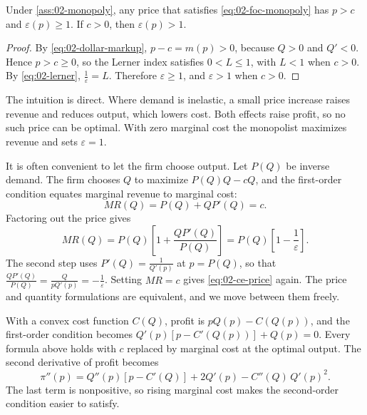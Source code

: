 \begin{proposition}\label{prop:02-elastic}
Under \cref{ass:02-monopoly}, any price that satisfies \eqref{eq:02-foc-monopoly} has $p > c$ and
$\varepsilon(p) \ge 1$. If $c > 0$, then $\varepsilon(p) > 1$.
\end{proposition}

\begin{proof}
By \eqref{eq:02-dollar-markup}, $p - c = m(p) > 0$, because $Q > 0$ and $Q' < 0$. Hence $p > c \ge 0$, so the
Lerner index satisfies $0 < L \le 1$, with $L < 1$ when $c > 0$. By \eqref{eq:02-lerner}, $\frac{1}{\varepsilon} = L$.
Therefore $\varepsilon \ge 1$, and $\varepsilon > 1$ when $c > 0$.
\end{proof}

The intuition is direct. Where demand is inelastic, a small price increase raises revenue and reduces output, which
lowers cost. Both effects raise profit, so no such price can be optimal. With zero marginal cost the monopolist
maximizes revenue and sets $\varepsilon = 1$.

It is often convenient to let the firm choose output. Let $P(Q)$ be inverse demand. The firm chooses $Q$ to maximize
$P(Q)Q - cQ$, and the first-order condition equates marginal revenue to marginal cost:
\begin{equation}\label{eq:02-mr}
  MR(Q) = P(Q) + QP'(Q) = c .
\end{equation}
Factoring out the price gives
\[
  MR(Q) = P(Q)\left[1 + \frac{QP'(Q)}{P(Q)}\right] = P(Q)\left[1 - \frac{1}{\varepsilon}\right] .
\]
The second step uses $P'(Q) = \frac{1}{Q'(p)}$ at $p = P(Q)$, so that $\frac{QP'(Q)}{P(Q)} = \frac{Q}{pQ'(p)} =
-\frac{1}{\varepsilon}$. Setting $MR = c$ gives \eqref{eq:02-ce-price} again. The price and quantity formulations
are equivalent, and we move between them freely.

\begin{remark}\label{rem:02-convex-cost}
With a convex cost function $C(Q)$, profit is $pQ(p) - C(Q(p))$, and the first-order condition becomes
$Q'(p)\left[p - C'(Q(p))\right] + Q(p) = 0$. Every formula above holds with $c$ replaced by marginal cost at the
optimal output. The second derivative of profit becomes
\[
  \pi''(p) = Q''(p)\left[p - C'(Q)\right] + 2Q'(p) - C''(Q)\,Q'(p)^2 .
\]
The last term is nonpositive, so rising marginal cost makes the second-order condition easier to satisfy.
\end{remark}

